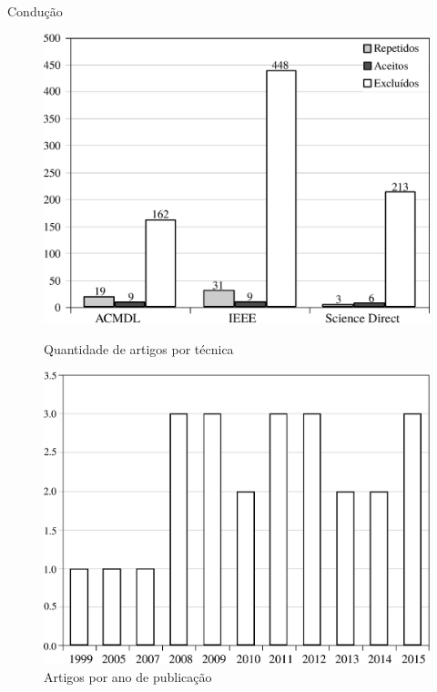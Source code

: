 \begin{frame}		
	\begin{block}{Condução}
		\begin{figure}
			\tiny
			\begin{minipage}[b]{0.46\textwidth}
				\includegraphics[width=\textwidth]{./secoes/RevisaoDaLiteratura/GraficoQuantidade.eps}
				\caption{Quantidade de artigos por técnica}
			\end{minipage}
		     \hspace{0.1cm}
			\begin{minipage}[b]{0.46\textwidth}
				\includegraphics[width=\textwidth]{./secoes/RevisaoDaLiteratura/GraficoQuantidadeAno.eps}
				\caption{Artigos por ano de publicação}
			\end{minipage}
		\end{figure}
		
	\end{block}
\end{frame}

